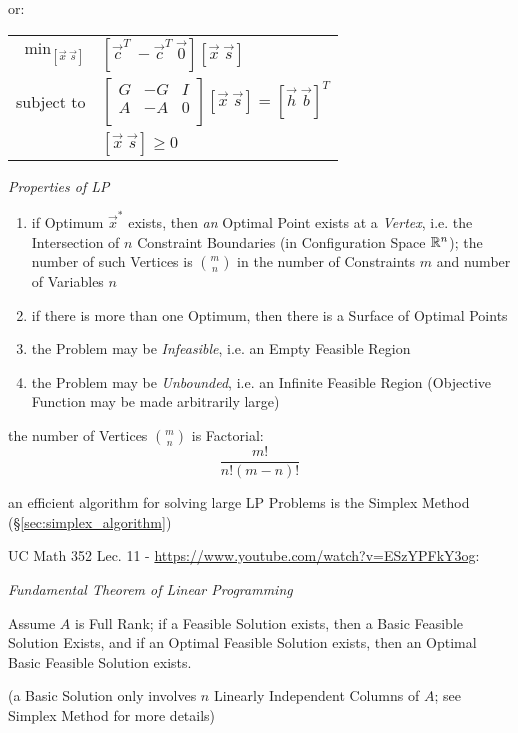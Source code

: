 or:

\begin{tabular}{r l}
  $\mathrm{min}_{[\vec{x} \ \vec{s}]}$ &
    $[\vec{c}^T \ -\vec{c}^T \ \vec{0}] [\vec{x} \ \vec{s}]$ \\
  subject to               &
    $\begin{bmatrix} G & -G & I \\ A & -A & 0 \\ \end{bmatrix}
      [\vec{x} \ \vec{s}] = [\vec{h} \ \vec{b}]^T$   \\
                           & $[\vec{x} \ \vec{s}] \geq 0$ \\
\end{tabular}


\emph{Properties of LP}

\begin{enumerate}
  \item if Optimum $\vec{x}^*$ exists, then \emph{an} Optimal Point exists at a
    \emph{Vertex}, i.e. the Intersection of $n$ Constraint Boundaries (in
    Configuration Space $\mathbb{R}^n$); the number of such Vertices is
    $\binom{m}{n}$ in the number of Constraints $m$ and number of Variables $n$
  \item if there is more than one Optimum, then there is a Surface of Optimal
    Points
  \item the Problem may be \emph{Infeasible}, i.e. an Empty Feasible Region
  \item the Problem may be \emph{Unbounded}, i.e. an Infinite Feasible Region
    (Objective Function may be made arbitrarily large)
\end{enumerate}

the number of Vertices $\binom{m}{n}$ is Factorial:
\[
  \frac{m!}{n!(m-n)!}
\]

an efficient algorithm for solving large LP Problems is the Simplex Method
(\S\ref{sec:simplex_algorithm})


UC Math 352 Lec. 11 - \url{https://www.youtube.com/watch?v=ESzYPFkY3og}:


\emph{Fundamental Theorem of Linear Programming}

Assume $A$ is Full Rank; if a Feasible Solution exists, then a Basic Feasible
Solution Exists, and if an Optimal Feasible Solution exists, then an Optimal
Basic Feasible Solution exists.

(a Basic Solution only involves $n$ Linearly Independent Columns of $A$; see
Simplex Method for more details)

